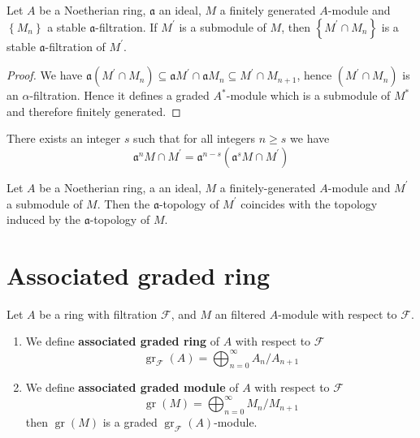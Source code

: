 \begin{proposition}
    Let $A$ be a Noetherian ring, $\mathfrak{a}$ an ideal, $M$ a finitely generated $A$-module and $\left\{M_n\right\}$ a stable $\mathfrak{a}$-filtration.
    If $M^\prime$ is a submodule of $M$, then $\left\{M^\prime\cap M_n\right\}$ is a stable $\mathfrak{a}$-filtration of $M^\prime$.
    \begin{proof}
        We have $\mathfrak{a}\left(M^{\prime} \cap M_n\right) \subseteq \mathfrak{a} M^{\prime} \cap \mathfrak{a} M_n \subseteq M^{\prime} \cap M_{n+1}$, hence $\left(M^{\prime} \cap M_n\right)$ is an $\alpha$-filtration. Hence it defines a graded $A^*$-module which is a submodule of $M^*$ and therefore finitely generated.
    \end{proof}
\end{proposition}

\begin{corollary}
    There exists an integer $s$ such that for all integers $n \geq s$ we have
    \begin{equation*}
        \mathfrak{a}^n M \cap M^\prime=\mathfrak{a}^{n-s}\left(\mathfrak{a}^s M \cap M^\prime\right)
    \end{equation*}
\end{corollary}


\begin{corollary}
    Let $A$ be a Noetherian ring, a an ideal, $M$ a finitely-generated $A$-module and $M^{\prime}$ a submodule of $M$. Then the $\mathfrak{a}$-topology of $M^{\prime}$ coincides with the topology induced by the $\mathfrak{a}$-topology of $M$.
\end{corollary}

\section{Associated graded ring} %
\begin{definition}
    Let $A$ be a ring with filtration $\mathcal{F}$, and $M$ an filtered $A$-module with respect to $\mathcal{F}$.
    \begin{enumerate}
        \item We define \textbf{associated graded ring} of $A$ with respect to $\mathcal{F}$
              \begin{equation*}
                  \operatorname{gr}_{\mathcal{F}}(A)=\bigoplus_{n=0}^{\infty} A_n / A_{n+1}
              \end{equation*}

        \item
              We define \textbf{associated graded module} of $A$ with respect to $\mathcal{F}$
              \begin{equation*}
                  \operatorname{gr}(M)=\bigoplus_{n=0}^{\infty} M_n / M_{n+1}
              \end{equation*}
              then $\operatorname{gr}(M)$ is a graded $\operatorname{gr}_{\mathcal{F}}(A)$-module.
    \end{enumerate}

\end{definition}

